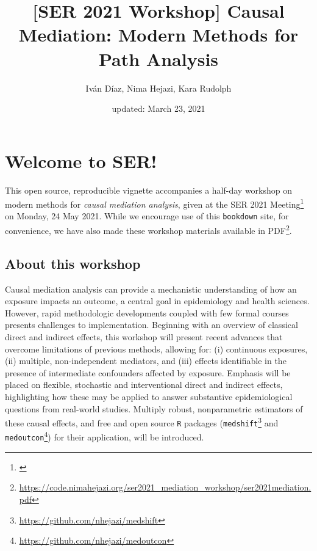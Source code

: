 \documentclass[
  12pt, krantz2,
]{book}
\title{{[}SER 2021 Workshop{]} Causal Mediation: Modern Methods for Path Analysis}
\author{Iván Díaz, Nima Hejazi, Kara Rudolph}
\date{updated: March 23, 2021}
\renewcommand{\href}[2]{#2\footnote{\url{#1}}}
\theoremstyle{definition}
\theoremstyle{definition}
\theoremstyle{definition}
\newcommand{\1}{\mathbbm{1}}
\begin{document}
\maketitle


\thispagestyle{empty}

\begin{center}

\end{center}

\setlength{\abovedisplayskip}{-5pt}
\setlength{\abovedisplayshortskip}{-5pt}

{
\hypersetup{linkcolor=}
\setcounter{tocdepth}{1}
\tableofcontents
}
\listoftables
\listoffigures
\hypertarget{welcome-to-ser}{%
\chapter*{Welcome to SER!}\label{welcome-to-ser}}


This open source, reproducible vignette accompanies a half-day workshop on
modern methods for \emph{causal mediation analysis}, given at the \href{}{SER 2021
Meeting} on Monday, 24 May 2021. While we encourage use of this \texttt{bookdown}
site, for convenience, we have also made these workshop materials \href{https://code.nimahejazi.org/ser2021_mediation_workshop/ser2021mediation.pdf}{available in
PDF}.

\hypertarget{about}{%
\section{About this workshop}\label{about}}

Causal mediation analysis can provide a mechanistic understanding of how an
exposure impacts an outcome, a central goal in epidemiology and health sciences.
However, rapid methodologic developments coupled with few formal courses
presents challenges to implementation. Beginning with an overview of classical
direct and indirect effects, this workshop will present recent advances that
overcome limitations of previous methods, allowing for: (i) continuous
exposures, (ii) multiple, non-independent mediators, and (iii) effects
identifiable in the presence of intermediate confounders affected by exposure.
Emphasis will be placed on flexible, stochastic and interventional direct and
indirect effects, highlighting how these may be applied to answer substantive
epidemiological questions from real-world studies. Multiply robust,
nonparametric estimators of these causal effects, and free and open source \texttt{R}
packages (\href{https://github.com/nhejazi/medshift}{\texttt{medshift}} and
\href{https://github.com/nhejazi/medoutcon}{\texttt{medoutcon}}) for their application, will
be introduced.
\end{document}

